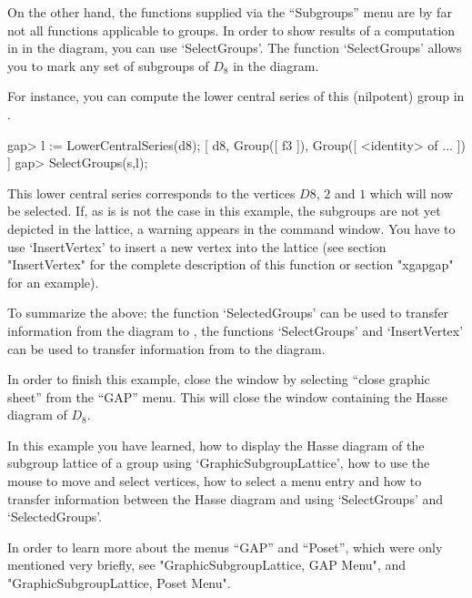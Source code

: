 On the other hand, the functions supplied via the ``Subgroups'' menu are by
far not all functions applicable to groups.  In order to show results of a
computation in {\GAP} in the diagram, you can use `SelectGroups'.  The
function `SelectGroups' allows you to mark any set of subgroups of $D_8$ in
the diagram.

For instance,  you can compute the lower central series of this (nilpotent)
group in {\GAP}.

\begintt
gap> l := LowerCentralSeries(d8);
[ d8, Group([ f3 ]), Group([ <identity> of ... ]) ]
gap> SelectGroups(s,l);
\endtt

This lower central series corresponds   to the vertices $D8$, $2$  and
$1$ which  will now be  selected.  If, as is  is not the case  in this
example, the subgroups are not yet depicted in  the lattice, a warning
appears in the  {\GAP} command window. You  have to use `InsertVertex'
to insert  a new vertex  into the  lattice (see section "InsertVertex"
for  the     complete  description of    this  function    or  section
"xgapgap" for an example).

To  summarize the above: the  function `SelectedGroups' can be used to
transfer information  from   the  diagram  to  {\GAP}, the   functions
`SelectGroups' and `InsertVertex' can  be used to transfer information
from {\GAP} to the diagram.

In order to finish this example, close the window by selecting ``close
graphic sheet'' from the ``GAP'' menu.  This will close the window
containing the Hasse diagram of $D_8$.

In this example you have learned, how to display the Hasse diagram of the
subgroup lattice of a group using `GraphicSubgroupLattice', how to use the
mouse to move and select vertices, how to select a menu entry and how to
transfer information between the Hasse diagram and {\GAP} using `SelectGroups'
and `SelectedGroups'.

In order to learn more about the menus ``GAP'' and ``Poset'', which were only
mentioned very briefly, see "GraphicSubgroupLattice, GAP Menu", and
"GraphicSubgroupLattice, Poset Menu".  



